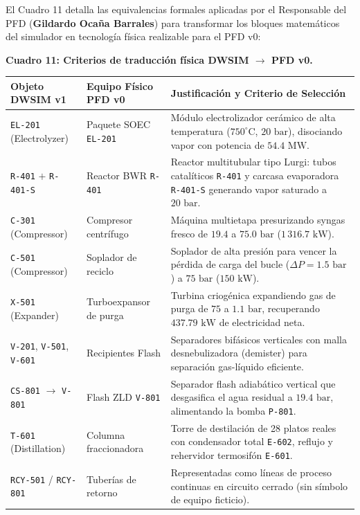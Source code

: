 \documentclass[11pt,letterpaper]{article}
\begin{document}
El Cuadro 11 detalla las equivalencias formales aplicadas por el Responsable del PFD (\textbf{Gildardo Ocaña Barrales}) para transformar los bloques matemáticos del simulador en tecnología física realizable para el PFD v0:

\begin{center}
\small
\textbf{Cuadro 11: Criterios de traducción física DWSIM $\to$ PFD v0.}\\[3pt]
\begin{tabularx}{\textwidth}{>{\raggedright\arraybackslash}p{3.4cm} >{\raggedright\arraybackslash}p{3.4cm} >{\raggedright\arraybackslash}X}
\toprule
\textbf{Objeto DWSIM v1} & \textbf{Equipo Físico PFD v0} & \textbf{Justificación y Criterio de Selección} \\
\midrule
\texttt{EL-201} (Electrolyzer) & Paquete SOEC \texttt{EL-201} & Módulo electrolizador cerámico de alta temperatura ($750^\circ\text{C}$, $20\text{ bar}$), disociando vapor con potencia de $54.4\text{ MW}$. \\
\texttt{R-401} $+$ \texttt{R-401-S} & Reactor BWR \texttt{R-401} & Reactor multitubular tipo Lurgi: tubos catalíticos \texttt{R-401} y carcasa evaporadora \texttt{R-401-S} generando vapor saturado a $20\text{ bar}$. \\
\texttt{C-301} (Compressor) & Compresor centrífugo & Máquina multietapa presurizando syngas fresco de $19.4$ a $75.0\text{ bar}$ ($1\,316.7\text{ kW}$). \\
\texttt{C-501} (Compressor) & Soplador de reciclo & Soplador de alta presión para vencer la pérdida de carga del bucle ($\Delta P = 1.5\text{ bar}$) a $75\text{ bar}$ ($150\text{ kW}$). \\
\texttt{X-501} (Expander) & Turboexpansor de purga & Turbina criogénica expandiendo gas de purga de $75$ a $1.1\text{ bar}$, recuperando $437.79\text{ kW}$ de electricidad neta. \\
\texttt{V-201}, \texttt{V-501}, \texttt{V-601} & Recipientes Flash & Separadores bifásicos verticales con malla desnebulizadora (demister) para separación gas-líquido eficiente. \\
\texttt{CS-801} $\to$ \texttt{V-801} & Flash ZLD \texttt{V-801} & Separador flash adiabático vertical que desgasifica el agua residual a $19.4\text{ bar}$, alimentando la bomba \texttt{P-801}. \\
\texttt{T-601} (Distillation) & Columna fraccionadora & Torre de destilación de 28 platos reales con condensador total \texttt{E-602}, reflujo y rehervidor termosifón \texttt{E-601}. \\
\texttt{RCY-501} / \texttt{RCY-801} & Tuberías de retorno & Representadas como líneas de proceso continuas en circuito cerrado (sin símbolo de equipo ficticio). \\
\bottomrule
\end{tabularx}
\end{center}
\end{document}

